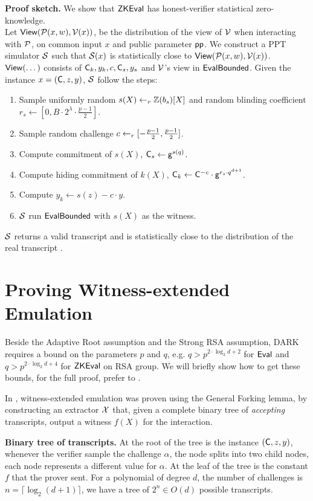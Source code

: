 \textbf{Proof sketch.} We show that $\mathsf{ZKEval}$ has honest-verifier statistical zero-knowledge.\\
Let $\mathsf{View}(\mathcal{P}(x, w), \mathcal{V}(x))$, be the distribution of the view of $\mathcal{V}$ when interacting with $\mathcal{P}$, on common input $x$ and public parameter $\mathsf{pp}$. We construct a PPT simulator $\mathcal{S}$ such that $\mathcal{S}(x)$ is statistically close to $\mathsf{View}(\mathcal{P}(x, w), \mathcal{V}(x))$.\\
$\mathsf{View}(\dots)$ consists of $\mathsf{C}_k, y_k, c, \mathsf{C}_s, y_s$ and $\mathcal{V}$'s view in $\mathsf{EvalBounded}$. Given the instance $x = (\mathsf{C}, z, y)$, $\mathcal{S}$ follow the steps:
\begin{enumerate}
    \item Sample uniformly random $s(X) \gets_r \mathbb{Z}(b_s)[X]$ and random blinding coefficient $r_s \gets [0, B \cdot 2^\lambda \cdot \frac{p-1}{2}]$.
    \item Sample random challenge $c \gets_r [-\frac{p-1}{2}, \frac{p-1}{2}]$.
    \item Compute commitment of $s(X)$, $\mathsf{C}_s \gets \mathsf{g}^{s(q)}$.
    \item Compute hiding commitment of $k(X)$, $\mathsf{C}_k \gets \mathsf{C}^{-c} \cdot \mathsf{g}^{r_s \cdot q^{d+1}}$.
    \item Compute $y_k \gets s(z) - c \cdot y$.
    \item $\mathcal{S}$ run $\mathsf{EvalBounded}$ with $s(X)$ as the witness.
\end{enumerate}
$\mathcal{S}$ returns a valid transcript and is statistically close to the distribution of the real transcript \cite{bunz2020transparent}.

\section{Proving Witness-extended Emulation}

Beside the Adaptive Root assumption and the Strong RSA assumption, DARK requires a bound on the parameters $p$ and $q$, e.g. $q > p^{2 \cdot \log_2 d + 2}$ for $\mathsf{Eval}$ and $q > p^{2 \cdot \log_2 d + 4}$ for $\mathsf{ZKEval}$ on RSA group. We will briefly show how to get these bounds, for the full proof, prefer to \cite{bunz2020transparent}.

In \cite{bunz2020transparent}, witness-extended emulation was proven using the General Forking lemma, by constructing an extractor $\mathcal{X}$ that, given a complete binary tree of \textit{accepting} transcripts, output a witness $f(X)$ for the interaction. 

\textbf{Binary tree of transcripts.} At the root of the tree is the instance $(\mathsf{C}, z, y)$, whenever the verifier sample the challenge $\alpha$, the node splits into two child nodes, each node represents a different value for $\alpha$. At the leaf of the tree is the constant $f$ that the prover sent. For a polynomial of degree $d$, the number of challenges is $n = \lceil \log_2 (d+1) \rceil$, we have a tree of $2^n \in O(d)$ possible transcripts.

